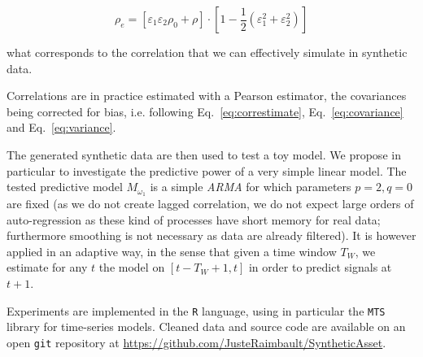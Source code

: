 \documentclass{bmcart}
\begin{document}
\begin{equation}
\label{eq:eff_corr}
\rho_e = \left[ \varepsilon_1 \varepsilon_2 \rho_0 + \rho \right] \cdot \left[ 1 - \frac{1}{2}\left(\varepsilon_1^2 + \varepsilon_2^2 \right) \right]
\end{equation}

{\noindent}what corresponds to the correlation that we can effectively simulate in synthetic data.

Correlations are in practice estimated with a Pearson estimator, the covariances being corrected for bias, i.e. following Eq.~\ref{eq:correstimate}, Eq.~\ref{eq:covariance} and Eq.~\ref{eq:variance}.


The generated synthetic data are then used to test a toy model. We propose in particular to investigate the predictive power of a very simple linear model. The tested predictive model $M_{\omega_1}$ is a simple \emph{ARMA} for which parameters $p=2,q=0$ are fixed (as we do not create lagged correlation, we do not expect large orders of auto-regression as these kind of processes have short memory for real data; furthermore smoothing is not necessary as data are already filtered). It is however applied in an adaptive way, in the sense that given a time window $T_W$, we estimate for any $t$ the model on $[t-T_W+1,t]$ in order to predict signals at $t+1$.


Experiments are implemented in the \texttt{R} language, using in particular the \texttt{MTS}~\cite{Tsay:2015xy} library for time-series models. Cleaned data and source code are available on an open \texttt{git} repository at \url{https://github.com/JusteRaimbault/SyntheticAsset}.
\end{document}
